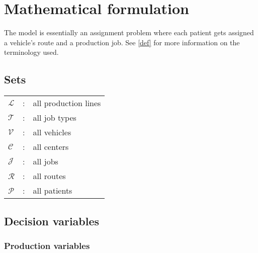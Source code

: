 \chapter{Mathematical formulation}
\label{matmod}

The model is essentially an assignment problem where each patient gets assigned a vehicle's route and a production job. See \ref{def} for more information on the terminology used.

\section{Sets}



\begin{tabular}{p{15mm}lp{105mm}}
    $\mathcal{L}$    & : & all production lines \\
    $\mathcal{T}$    & : & all job types \\                    
    $\mathcal{V}$    & : & all vehicles \\    
    $\mathcal{C}$    & : & all centers \\    
    $\mathcal{J}$    & : & all jobs \\    
    $\mathcal{R}$    & : & all routes \\    
    $\mathcal{P}$    & : & all patients \\
\end{tabular}
\bigskip

\section{Decision variables}

\subsection{Production variables}

